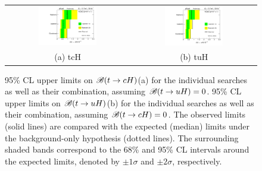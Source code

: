 \documentclass[PAPER, coverpage, atlasdraft=true, texlive=2016, UKenglish]{\ATLASLATEXPATH atlasdoc} %
\begin{document}
\begin{figure}[h!]
\begin{center}
\begin{tabular}{@{}cc@{}}
\includegraphics[width=0.49\textwidth]{figures/tcH_Limits.pdf}&
\includegraphics[width=0.49\textwidth]{figures/tuH_Limits.pdf}\\
(a) tcH & (b) tuH \\
\end{tabular}
\caption{\small {95\% CL upper limits on $\mathscr{B}(t\to cH)$(a) for the individual searches as well as their
combination, assuming $\mathscr{B}(t\to uH)=0$. 95\% CL upper limits on $\mathscr{B}(t\to uH)$(b) for the individual searches as well as their
combination, assuming $\mathscr{B}(t\to cH)=0$. The observed limits (solid lines) are compared with the 
expected (median) limits under the background-only hypothesis (dotted lines). The surrounding shaded bands correspond to the 68\% and 95\% CL intervals around the expected limits, 
denoted by $\pm 1\sigma$ and $\pm 2\sigma$, respectively.
}}
\label{fig:limits_combo_1D_hc} 
\end{center}
\end{figure}

\end{document}
